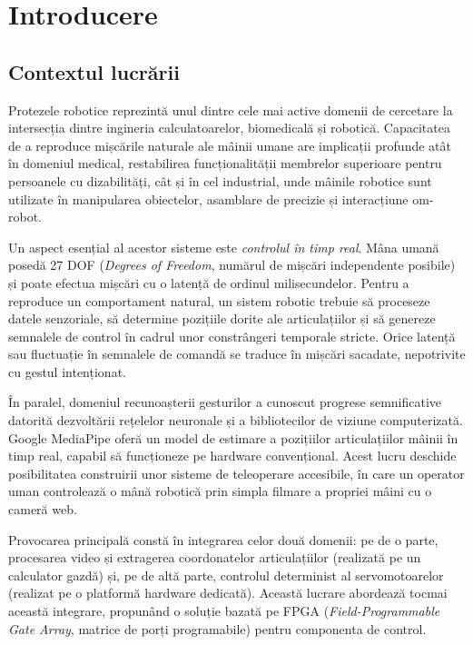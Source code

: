 \chapter{Introducere}\label{ch:intro}
\pagestyle{fancy}

\section{Contextul lucrării}
\label{sec:intro-context}

Protezele robotice reprezintă unul dintre cele mai active domenii de cercetare la
intersecția dintre ingineria calculatoarelor, biomedicală și robotică. Capacitatea de
a reproduce mișcările naturale ale mâinii umane are implicații profunde atât în
domeniul medical, restabilirea funcționalității membrelor superioare pentru
persoanele cu dizabilități, cât și în cel industrial, unde mâinile robotice sunt
utilizate în manipularea obiectelor, asamblare de precizie și interacțiune
om-robot.

Un aspect esențial al acestor sisteme este \textit{controlul în timp real}. Mâna
umană posedă 27 DOF (\textit{Degrees of Freedom}, numărul de mișcări independente
posibile) și poate efectua mișcări cu o latență de ordinul milisecundelor. Pentru
a reproduce un comportament natural, un sistem robotic trebuie să proceseze datele
senzoriale, să determine pozițiile dorite ale articulațiilor și să genereze
semnalele de control în cadrul unor constrângeri temporale stricte. Orice latență
sau fluctuație în semnalele de comandă se traduce în mișcări sacadate, nepotrivite
cu gestul intenționat.

În paralel, domeniul recunoașterii gesturilor a cunoscut progrese semnificative
datorită dezvoltării rețelelor neuronale și a bibliotecilor de viziune
computerizată. Google MediaPipe \cite{mediapipe2019} oferă un model de estimare a
pozițiilor articulațiilor mâinii în timp real, capabil să funcționeze pe
hardware convențional. Acest lucru deschide posibilitatea construirii unor
sisteme de teleoperare accesibile, în care un operator uman controlează o mână
robotică prin simpla filmare a propriei mâini cu o cameră web.

Provocarea principală constă în integrarea celor două domenii: pe de o parte,
procesarea video și extragerea coordonatelor articulațiilor (realizată pe un
calculator gazdă) și, pe de altă parte, controlul determinist al servomotoarelor
(realizat pe o platformă hardware dedicată). Această lucrare abordează tocmai
această integrare, propunând o soluție bazată pe FPGA (\textit{Field-Programmable
Gate Array}, matrice de porți programabile) pentru componenta de control.

